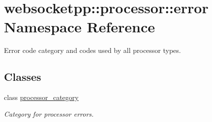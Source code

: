 \hypertarget{namespacewebsocketpp_1_1processor_1_1error}{}\section{websocketpp\+:\+:processor\+:\+:error Namespace Reference}
\label{namespacewebsocketpp_1_1processor_1_1error}


Error code category and codes used by all processor types.  


\subsection*{Classes}
\begin{DoxyCompactItemize}
\item 
class \mbox{\hyperlink{classwebsocketpp_1_1processor_1_1error_1_1processor__category}{processor\+\_\+category}}
\begin{DoxyCompactList}\small\item\em Category for processor errors. \end{DoxyCompactList}\end{DoxyCompactItemize}
